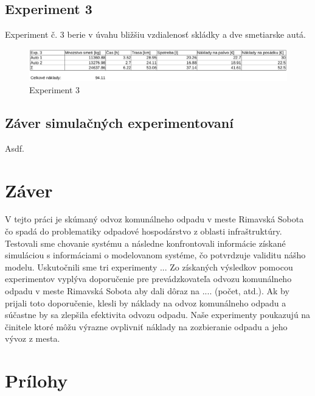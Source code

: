 \documentclass[11pt,a4paper]{article}
\begin{document}
    \subsection{Experiment 3}

        Experiment č. 3 berie v úvahu bližšiu vzdialenosť skládky a dve smetiarske autá.

\begin{figure}[h]
    \center
    \includegraphics[scale=0.3]{img/exp3.eps}
    \caption{Experiment 3}
    \label{E3}
\end{figure}

    \subsection{Záver simulačných experimentovaní}

        Asdf.

\section{Záver}

    \indent V tejto práci je skúmaný odvoz komunálneho odpadu v meste Rimavská Sobota čo spadá do problematiky odpadové hospodárstvo z oblasti infraštruktúry. Testovali sme chovanie systému a následne konfrontovali informácie získané simuláciou s informáciami o modelovanom systéme, čo potvrdzuje validitu nášho modelu. Uskutočnili sme tri experimenty ... Zo získaných výsledkov pomocou experimentov vyplýva doporučenie pre prevádzkovateľa odvozu komunálneho odpadu v meste Rimavská Sobota aby dali dôraz na .... (počet, atd.). Ak by prijali toto doporučenie, klesli by náklady na odvoz komunálneho odpadu a súčastne by sa zlepšila efektivita odvozu odpadu. Naše experimenty poukazujú na činitele ktoré môžu výrazne ovplivniť náklady na zozbieranie odpadu a jeho vývoz z mesta.

\newpage
\section{Prílohy}
\end{document}
